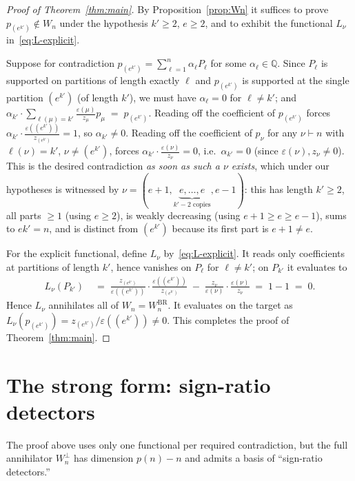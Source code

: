 \documentclass[11pt]{article}
\theoremstyle{definition}
\newcommand{\eps}{\varepsilon}
\newcommand{\QQ}{\mathbb{Q}}
\begin{document}
\begin{proof}[Proof of Theorem~\ref{thm:main}]
By Proposition~\ref{prop:Wn} it suffices to prove $p_{(e^{k'})}\notin W_n$
under the hypothesis $k'\ge 2$, $e\ge 2$, and to exhibit the functional
$L_\nu$ in~\eqref{eq:L-explicit}.

Suppose for contradiction $p_{(e^{k'})}=\sum_{\ell=1}^n\alpha_\ell P_\ell$
for some $\alpha_\ell\in\QQ$. Since $P_\ell$ is supported on partitions of
length exactly $\ell$ and $p_{(e^{k'})}$ is supported at the single
partition $(e^{k'})$ (of length $k'$), we must have $\alpha_\ell=0$ for
$\ell\ne k'$; and $\alpha_{k'}\cdot\sum_{\ell(\mu)=k'}\frac{\eps(\mu)}{z_\mu}p_\mu
   \;=\;p_{(e^{k'})}$.
Reading off the coefficient of $p_{(e^{k'})}$ forces
$\alpha_{k'}\cdot\frac{\eps((e^{k'}))}{z_{(e^{k'})}}=1$, so
$\alpha_{k'}\ne 0$. Reading off the coefficient of $p_\nu$ for any
$\nu\vdash n$ with $\ell(\nu)=k'$, $\nu\ne(e^{k'})$, forces
$\alpha_{k'}\cdot\frac{\eps(\nu)}{z_\nu}=0$, i.e.\ $\alpha_{k'}=0$
(since $\eps(\nu),z_\nu\ne 0$). This is the desired contradiction \emph{as
soon as such a $\nu$ exists}, which under our hypotheses is witnessed by
$\nu=(e{+}1,\underbrace{e,\ldots,e}_{k'-2\text{ copies}},e{-}1)$: this has
length $k'\ge 2$, all parts $\ge 1$ (using $e\ge 2$), is weakly decreasing
(using $e{+}1\ge e\ge e{-}1$), sums to $ek'=n$, and is distinct from
$(e^{k'})$ because its first part is $e{+}1\ne e$.

For the explicit functional, define $L_\nu$ by~\eqref{eq:L-explicit}. It
reads only coefficients at partitions of length $k'$, hence vanishes on
$P_\ell$ for $\ell\ne k'$; on $P_{k'}$ it evaluates to
\begin{align*}
   L_\nu(P_{k'})
   &\;=\;\frac{z_{(e^{k'})}}{\eps((e^{k'}))}\cdot\frac{\eps((e^{k'}))}{z_{(e^{k'})}}
        \;-\;\frac{z_\nu}{\eps(\nu)}\cdot\frac{\eps(\nu)}{z_\nu} \;=\; 1-1 \;=\; 0.
\end{align*}
Hence $L_\nu$ annihilates all of $W_n=W_n^{\mathrm{BR}}$. It evaluates
on the target as
$L_\nu(p_{(e^{k'})})=z_{(e^{k'})}/\eps((e^{k'}))\ne 0$.
This completes the proof of Theorem~\ref{thm:main}.
\end{proof}

\section{The strong form: sign-ratio detectors}

The proof above uses only one functional per required contradiction, but
the full annihilator $W_n^\perp$ has dimension $p(n)-n$ and admits a basis
of ``sign-ratio detectors.''
\end{document}
